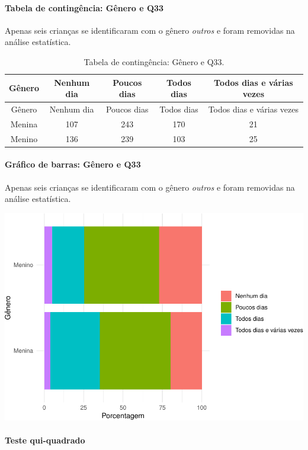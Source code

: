\documentclass[]{article}
\let\oldparagraph\paragraph
\renewcommand{\paragraph}[1]{\oldparagraph{#1}\mbox{}}
\begin{document}
\cleardoublepage

\hypertarget{tabela-de-continguxeancia-guxeanero-e-q33}{%
\paragraph{Tabela de contingência: Gênero e Q33}\label{tabela-de-continguxeancia-guxeanero-e-q33}}

Apenas seis crianças se identificaram com o gênero \emph{outros} e foram removidas na análise estatística.

\begin{longtable}[]{@{}ccccc@{}}
\caption{\label{tab:unnamed-chunk-1144}Tabela de contingência: Gênero e Q33.}\tabularnewline
\toprule
Gênero & Nenhum dia & Poucos dias & Todos dias & Todos dias e várias vezes\tabularnewline
\midrule
\endfirsthead
\toprule
Gênero & Nenhum dia & Poucos dias & Todos dias & Todos dias e várias vezes\tabularnewline
\midrule
\endhead
Menina & 107 & 243 & 170 & 21\tabularnewline
Menino & 136 & 239 & 103 & 25\tabularnewline
\bottomrule
\end{longtable}

\hypertarget{gruxe1fico-de-barras-guxeanero-e-q33}{%
\paragraph{Gráfico de barras: Gênero e Q33}\label{gruxe1fico-de-barras-guxeanero-e-q33}}

Apenas seis crianças se identificaram com o gênero \emph{outros} e foram removidas na análise estatística.

\begin{center}\includegraphics[width=0.75\linewidth]{relatorio_covid19_files/figure-latex/unnamed-chunk-1145-1} \end{center}

\hypertarget{teste-qui-quadrado-98}{%
\paragraph{Teste qui-quadrado}\label{teste-qui-quadrado-98}}
\end{document}
